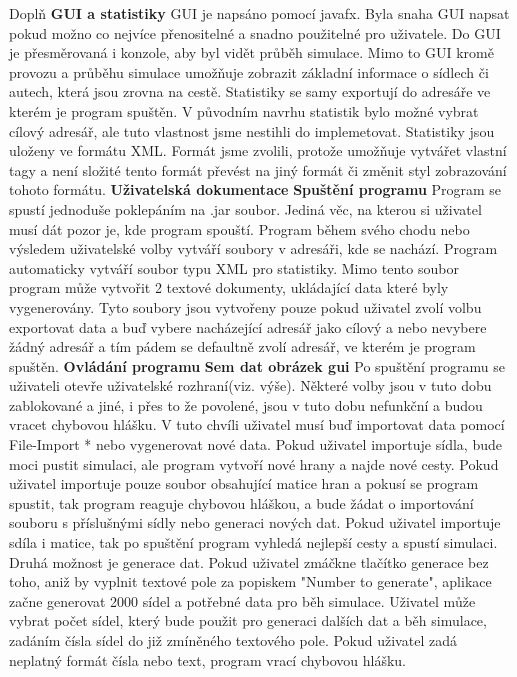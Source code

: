 \documentclass[ 12pt, a4paper]{report}
\begin{document}
Doplň\newline\newline
{\large\bf GUI a statistiky}\newline
GUI je napsáno pomocí javafx. Byla snaha GUI napsat pokud možno co nejvíce přenositelné a snadno použitelné pro uživatele. Do GUI je přesměrovaná i konzole, aby byl vidět průběh simulace. Mimo to GUI kromě provozu a průběhu simulace umožňuje zobrazit základní informace o sídlech či autech, která jsou zrovna na cestě.\newline
Statistiky se samy exportují do adresáře ve kterém je program spuštěn. V původním navrhu statistik bylo možné vybrat cílový adresář, ale tuto vlastnost jsme nestihli do implemetovat. Statistiky jsou uloženy ve formátu XML. Formát jsme zvolili, protože umožňuje vytvářet vlastní tagy a není složité tento formát převést na jiný formát či změnit styl zobrazování tohoto formátu.
\newpage
{\Large\bf\noindent Uživatelská dokumentace}\newline
{\large\bf Spuštění programu}\newline
Program se spustí jednoduše poklepáním na .jar soubor. Jediná věc, na kterou si uživatel musí dát pozor je, kde program spouští. Program během svého chodu nebo výsledem uživatelské volby vytváří soubory v adresáři, kde se nachází. Program automaticky vytváří soubor typu XML pro statistiky. Mimo tento soubor program může vytvořit 2 textové dokumenty, ukládající data které byly vygenerovány. Tyto soubory jsou vytvořeny pouze pokud uživatel zvolí volbu exportovat data a buď vybere nacházející adresář jako cílový a nebo nevybere žádný adresář a tím pádem se defaultně zvolí adresář, ve kterém je program spuštěn.\newline\newline
{\large\bf Ovládání programu}\newline
\textbf{Sem dat obrázek gui}
Po spuštění programu se uživateli otevře uživatelské rozhraní(viz. výše). Některé volby jsou v tuto dobu zablokované a jiné, i přes to že povolené, jsou v tuto dobu nefunkční a budou vracet chybovou hlášku. V tuto chvíli uživatel musí buď importovat data pomocí File-Import * nebo vygenerovat nové data. Pokud uživatel importuje sídla, bude moci pustit simulaci, ale program vytvoří nové hrany a najde nové cesty. Pokud uživatel importuje pouze soubor obsahující matice hran a pokusí se program spustit, tak program reaguje chybovou hláškou, a bude žádat o importování souboru s příslušnými sídly nebo generaci nových dat. Pokud uživatel importuje sdíla i matice, tak po spuštění program vyhledá nejlepší cesty a spustí simulaci. Druhá možnost je generace dat. Pokud uživatel zmáčkne tlačítko generace bez toho, aniž by vyplnit textové pole za popiskem "Number to generate", aplikace začne generovat 2000 sídel a potřebné data pro běh simulace. Uživatel může vybrat počet sídel, který bude použit pro generaci dalších dat a běh simulace, zadáním čísla sídel do již zmíněného textového pole. Pokud uživatel zadá neplatný formát čísla nebo text, program vrací chybovou hlášku.\newline
\end{document}

